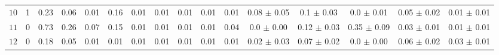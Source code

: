 \begin{tabular}{l|cc|cccccccc|ccccc}
 $10$  & 1 & 0.23 & 0.06 & 0.01 & 0.16 & 0.01 & 0.01 & 0.01 & 0.01 & 0.01 & 0.08 $\pm$ 0.05 & 0.1 $\pm$ 0.03 & 0.0 $\pm$ 0.01 & 0.05 $\pm$ 0.02 & 0.01 $\pm$ 0.01 \\ 
 $11$  & 0 & 0.73 & 0.26 & 0.07 & 0.15 & 0.01 & 0.01 & 0.01 & 0.01 & 0.04 & 0.0 $\pm$ 0.00 & 0.12 $\pm$ 0.03 & 0.35 $\pm$ 0.09 & 0.03 $\pm$ 0.01 & 0.01 $\pm$ 0.01 \\ 
 $12$  & 0 & 0.18 & 0.05 & 0.01 & 0.01 & 0.01 & 0.01 & 0.01 & 0.01 & 0.01 & 0.02 $\pm$ 0.03 & 0.07 $\pm$ 0.02 & 0.0 $\pm$ 0.00 & 0.06 $\pm$ 0.02 & 0.03 $\pm$ 0.01 \\ 
\end{tabular} 
